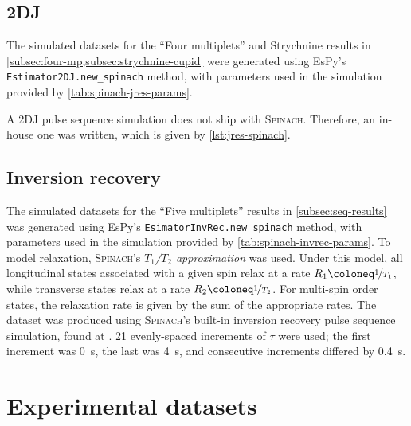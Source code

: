 

\subsection{\acs{2DJ}}
The simulated datasets for the ``Four multiplets'' and Strychnine results in
\cref{subsec:four-mp,subsec:strychnine-cupid} were generated
using \ac{EsPy}'s \texttt{Estimator2DJ.new_spinach} method, with
parameters used in the simulation provided by
\cref{tab:spinach-jres-params}.



A \ac{2DJ} pulse sequence simulation does not ship with \textsc{Spinach}.
Therefore, an in-house one was written, which is given by
\cref{lst:jres-spinach}.


\subsection{Inversion recovery}
The simulated datasets for the ``Five multiplets'' results in
\cref{subsec:seq-results} was generated using \ac{EsPy}'s
\texttt{EsimatorInvRec.new_spinach} method, with
parameters used in the simulation provided by
\cref{tab:spinach-invrec-params}.
To model relaxation, \textsc{Spinach}'s \emph{$T_1$/$T_2$ approximation} was
used\cite{SpinachRelax}. Under this model, all longitudinal states associated
with a given spin relax at a rate $R_1 \coloneq \nicefrac{1}{T_1}$, while
transverse states relax at a rate $R_2 \coloneq \nicefrac{1}{T_2}$. For
multi-spin order states, the relaxation rate is given by the sum of the
appropriate rates. The dataset was produced using \textsc{Spinach}'s built-in
inversion recovery pulse sequence simulation, found at
. 21 evenly-spaced increments of
$\tau$ were used; the first increment was \qty{0}{\second}, the last was
\qty{4}{\second}, and consecutive increments differed by \qty{0.4}{\second}.



\section{Experimental datasets}

